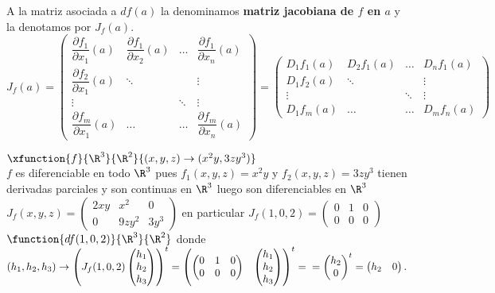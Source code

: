 	\begin{defi} A la matriz asociada a $df(a)$ la denominamos \textbf{matriz jacobiana de $f$ en $a$} y la denotamos por $J_f(a)$.\\
	$J_f(a)=\begin{pmatrix}
	\dfrac{\partial f_1}{\partial x_1}(a) & \dfrac{\partial f_1}{\partial x_2}(a) & \ldots & \dfrac{\partial f_1}{\partial x_n}(a)\\ \dfrac{\partial f_2}{\partial x_1}(a)& \ddots & &\vdots\\ \vdots & & \ddots & \vdots\\ \dfrac{\partial f_m}{\partial x_1}(a)& \ldots & \ldots & \dfrac{\partial f_m}{\partial x_n}(a)
	\end{pmatrix}=\begin{pmatrix}
	D_1f_1(a) & D_2f_1(a) & \ldots & D_nf_1(a)\\ D_1f_2(a)& \ddots & &\vdots\\ \vdots & & \ddots & \vdots\\ D_1f_m(a)& \ldots & \ldots & D_mf_n(a)
	\end{pmatrix}$
	\end{defi}
	
	\begin{ejem} $\xfunction{f}{\R^3}{\R^2}{(x,y,z)\rightarrow(x^2y,3zy^3)}$\\
	$f$ es diferenciable en todo $\R^3$ pues $f_1(x,y,z)=x^2y$ y $f_2(x,y,z)=3zy^3$ tienen derivadas parciales y son continuas en $\R^3$ luego son diferenciables en $\R^3$\\
	$J_f(x,y,z)=\begin{pmatrix} 2xy&x^2&0\\0&9zy^2&3y^3	
	\end{pmatrix}$ en particular $J_f(1,0,2)=\begin{pmatrix}0&1&0\\0&0&0\end{pmatrix}$\\
	$\function{df(1,0,2)}{\R^3}{\R^2}$ donde $(h_1,h_2,h_3)\rightarrow \begin{pmatrix}
	J_f(1,0,2)\begin{pmatrix}h_1\\h_2\\h_3	\end{pmatrix}\end{pmatrix}^t=\begin{pmatrix}
	\begin{pmatrix}0&1&0\\0&0&0	\end{pmatrix} &\begin{pmatrix}h_1\\h_2\\h_3\\	\end{pmatrix}
	\end{pmatrix}^t=\\=\begin{pmatrix}h_2\\0	\end{pmatrix}^t=\begin{pmatrix}h_2 & 0	\end{pmatrix}. $
	\end{ejem}
	
